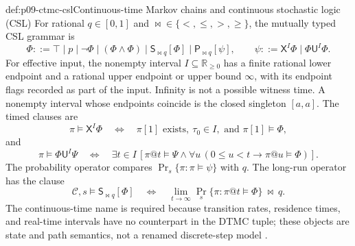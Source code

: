 \begin{hbdefinition}{def:p09-ctmc-csl}{Continuous-time Markov chains and continuous stochastic logic (CSL)}
For rational \(q\in[0,1]\) and
\(\bowtie\in\{<,\leq,>,\geq\}\), the mutually typed CSL grammar is
\[
 \Phi ::= \top\mid p\mid\neg\Phi\mid(\Phi\land\Phi)
          \mid\mathsf S_{\bowtie q}[\Phi]
          \mid\mathsf P_{\bowtie q}[\psi],
 \qquad
 \psi ::= \mathsf X^{I}\Phi
          \mid\Phi\mathbin{\mathsf U^{I}}\Phi.
\]
For effective input, the nonempty interval
\(I\subseteq\mathbb R_{\geq0}\) has a finite rational lower endpoint and
a rational upper endpoint or upper bound \(\infty\), with its endpoint
flags recorded as part of the input.  Infinity is not a possible witness
time.  A nonempty interval whose endpoints coincide is the closed singleton
\([a,a]\).  The timed clauses are
\[
 \pi\models\mathsf X^I\Phi
 \quad\Longleftrightarrow\quad
 \pi[1]\text{ exists},\ \tau_0\in I,\text{ and }\pi[1]\models\Phi,
\]
and
\[
 \pi\models\Phi\mathbin{\mathsf U^I}\Psi
 \quad\Longleftrightarrow\quad
 \exists t\in I\,[\pi@t\models\Psi\land
   \forall u\,(0\leq u<t\to\pi@u\models\Phi)].
\]
The probability operator compares \(\Pr_s\{\pi:\pi\models\psi\}\) with
\(q\).  The long-run operator has the clause
\[
 \mathcal C,s\models\mathsf S_{\bowtie q}[\Phi]
 \quad\Longleftrightarrow\quad
 \lim_{t\to\infty}
   \Pr_s\{\pi:\pi@t\models\Phi\}\ \bowtie\ q.
\]
The continuous-time name is required because transition rates, residence
times, and real-time intervals have no counterpart in the DTMC tuple; these
objects are state and path semantics, not a renamed discrete-step model
\cite[Defs.~4--6 and \S\S3.1--3.3]{BaierHaverkortHermannsKatoen2003}.
\end{hbdefinition}

